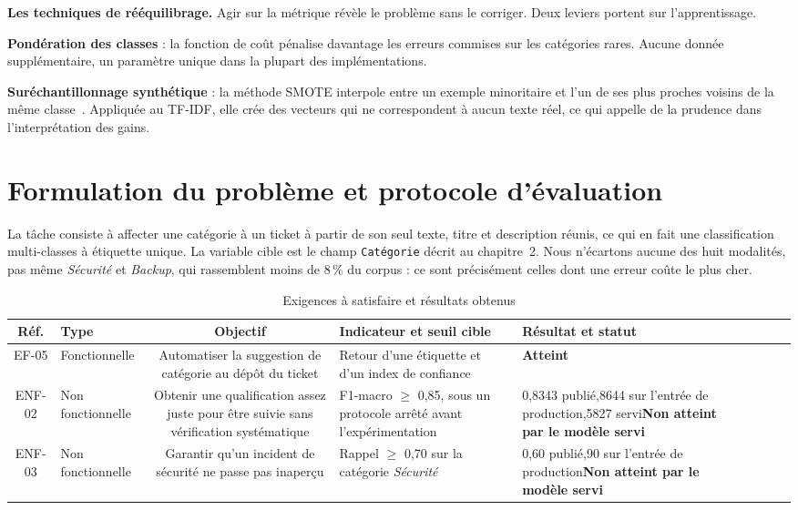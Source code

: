\textbf{Les techniques de rééquilibrage.} Agir sur la métrique révèle le problème sans le corriger. Deux leviers portent sur l'apprentissage.

\begin{puces}
\item \textbf{Pondération des classes} : la fonction de coût pénalise davantage les erreurs commises
sur les catégories rares. Aucune donnée supplémentaire, un paramètre unique dans la plupart des
implémentations.
\item \textbf{Suréchantillonnage synthétique} : la méthode SMOTE interpole entre un exemple
minoritaire et l'un de ses plus proches voisins de la même classe~\cite{chawla2002}. Appliquée au
TF-IDF, elle crée des vecteurs qui ne correspondent à aucun texte réel, ce qui appelle de la
prudence dans l'interprétation des gains.
\end{puces}

\section{Formulation du problème et protocole d'évaluation}

La tâche consiste à affecter une catégorie à un ticket à partir de son seul texte, titre et
description réunis, ce qui en fait une classification multi-classes à étiquette unique. La variable
cible est le champ \texttt{Catégorie} décrit au chapitre~2. Nous n'écartons aucune des huit
modalités, pas même \emph{Sécurité} et \emph{Backup}, qui rassemblent moins de 8\,\% du corpus : ce
sont précisément celles dont une erreur coûte le plus cher.

\begin{table}[!htbp]
\centering
\styletableau
\caption{Exigences à satisfaire et résultats obtenus}
\label{tab:exigences4}
\begin{tabular}{|Cp{1.5cm}|Cp{2.3cm}|Lp{3.6cm}|Lp{3.1cm}|Lp{2.6cm}|}
\hline
{}
\textbf{Réf.} & \textbf{Type} & \textbf{Objectif} & \textbf{Indicateur et seuil cible} & \textbf{Résultat et statut} \\
\hline
EF-05 & Fonctionnelle & Automatiser la suggestion de catégorie au dépôt du ticket & Retour d'une
étiquette et d'un index de confiance & \textbf{Atteint} \\
\hline
ENF-02 & Non fonctionnelle & Obtenir une qualification assez juste pour être suivie sans
vérification systématique & F1-macro $\geq$ 0,85, sous un protocole arrêté avant
l'expérimentation & 0,8343 publié,8644 sur l'entrée de production,5827
servi\newline \textbf{Non atteint par le modèle servi} \\
\hline
ENF-03 & Non fonctionnelle & Garantir qu'un incident de sécurité ne passe pas inaperçu & Rappel
$\geq$ 0,70 sur la catégorie \emph{Sécurité} & 0,60 publié,90 sur l'entrée de
production\newline \textbf{Non atteint par le modèle servi} \\
\hline
\end{tabular}
\end{table}

